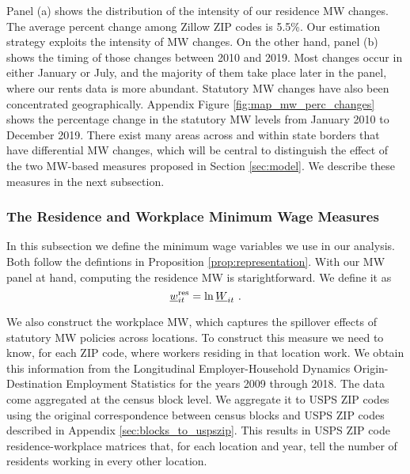 Panel (a) shows the distribution of the intensity of our residence MW changes. 
The average percent change among Zillow ZIP codes is 5.5\%.
Our estimation strategy exploits the intensity of MW changes.
On the other hand, panel (b) shows the timing of those changes between 2010 and 
2019.
Most changes occur in either January or July, and the majority of them take 
place later in the panel, where our rents data is more abundant.
Statutory MW changes have also been concentrated geographically.
Appendix Figure \ref{fig:map_mw_perc_changes} shows the percentage change 
in the statutory MW levels from January 2010 to December 2019.
There exist many areas across and within state borders that have differential 
MW changes,
which will be central to distinguish the effect of the two MW-based measures
proposed in Section \ref{sec:model}.
We describe these measures in the next subsection. 

\subsubsection*{The Residence and Workplace Minimum Wage Measures}

In this subsection we define the minimum wage variables we use in our analysis.
Both follow the defintions in Proposition \ref{prop:representation}.
With our MW panel at hand, computing the residence MW is starightforward.
We define it as
\begin{equation*}
    \underline{w}^{\text{res}}_{it} = \ln \underline{W}_{it} \ .
\end{equation*}

We also construct the workplace MW, which captures the spillover effects of
statutory MW policies across locations.
To construct this measure we need to know, for each ZIP code, where workers 
residing in that location work.
We obtain this information from the Longitudinal Employer-Household 
Dynamics Origin-Destination Employment Statistics \parencite[LODES;][]{LODES}
for the years 2009 through 2018.
The data come aggregated at the census block level.
We aggregate it to USPS ZIP codes using the original correspondence between 
census blocks and USPS ZIP codes described in Appendix 
\ref{sec:blocks_to_uspszip}.
This results in USPS ZIP code residence-workplace matrices that, for each 
location and year, tell the number of residents working in every other 
location.

